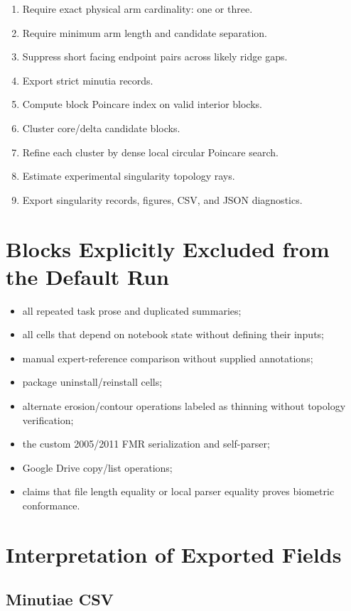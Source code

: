 \documentclass[11pt]{article}
\begin{document}
\begin{enumerate}
  \item Require exact physical arm cardinality: one or three.
  \item Require minimum arm length and candidate separation.
  \item Suppress short facing endpoint pairs across likely ridge gaps.
  \item Export strict minutia records.
  \item Compute block Poincare index on valid interior blocks.
  \item Cluster core/delta candidate blocks.
  \item Refine each cluster by dense local circular Poincare search.
  \item Estimate experimental singularity topology rays.
  \item Export singularity records, figures, CSV, and JSON diagnostics.
\end{enumerate}

\section{Blocks Explicitly Excluded from the Default Run}

\begin{itemize}
  \item all repeated task prose and duplicated summaries;
  \item all cells that depend on notebook state without defining their inputs;
  \item manual expert-reference comparison without supplied annotations;
  \item package uninstall/reinstall cells;
  \item alternate erosion/contour operations labeled as thinning without topology verification;
  \item the custom 2005/2011 FMR serialization and self-parser;
  \item Google Drive copy/list operations;
  \item claims that file length equality or local parser equality proves biometric conformance.
\end{itemize}

\section{Interpretation of Exported Fields}

\subsection{Minutiae CSV}
\end{document}
